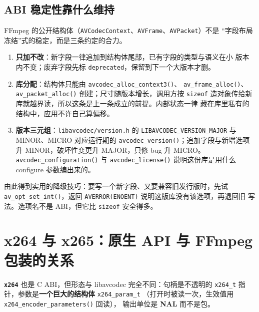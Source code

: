 \documentclass[12pt,a4paper,fontset=fandol]{ctexbook}
\newcommand{\Fn}[1]{\texttt{#1()}}
\newcommand{\Tp}[1]{\texttt{#1}}
\newcommand{\Bk}{\discretionary{}{}{}}
\newcommand{\Lib}[1]{\textbf{\texttt{#1}}}
\begin{document}
\subsection{ABI 稳定性靠什么维持}

FFmpeg 的公开结构体（\Tp{AVCodecContext}、\Tp{AVFrame}、\Tp{AVPacket}）不是
``字段布局冻结''式的稳定，而是三条约定的合力。

\begin{enumerate}
\item \textbf{只加不改}：新字段一律追加到结构体尾部，已有字段的类型与语义在小
  版本内不变；废弃字段先标 \Tp{deprecated}，保留到下一个大版本才删。
\item \textbf{库分配}：结构体只能由 \Fn{avcodec\_{\Bk}alloc\_{\Bk}context3}、
  \Fn{av\_{\Bk}frame\_{\Bk}alloc}、\Fn{av\_{\Bk}packet\_{\Bk}alloc} 创建；尺寸随版本增长，调用方按
  \texttt{sizeof} 造对象传给新库就越界读，所以这条是上一条成立的前提。内部状态一律
  藏在库里私有的结构中，应用不许自己算偏移。
\item \textbf{版本三元组}：\texttt{libavcodec/{\Bk}version.h} 的
  \Tp{LIBAVCODEC\_VERSION\_MAJOR} 与 MINOR、MICRO 对应运行期的
  \Fn{avcodec\_version}；追加字段与新增选项升 MINOR，破坏性变更升 MAJOR，只修 bug
  升 MICRO。\Fn{avcodec\_configuration} 与 \Fn{avcodec\_license} 说明这份库是用什么
  configure 参数编出来的。
\end{enumerate}

由此得到实用的降级技巧：要写一个新字段、又要兼容旧发行版时，先试
\Fn{av\_{\Bk}opt\_{\Bk}set\_{\Bk}int}，返回 \Tp{AVERROR(ENOENT)} 说明这版库没有该选项，再退回旧
写法。选项名不是 ABI，但它比 \texttt{sizeof} 安全得多。

\section{x264 与 x265：原生 API 与 FFmpeg 包装的关系}

\Lib{x264} 也是 C ABI，但形态与 libavcodec 完全不同：句柄是不透明的
\Tp{x264\_t} 指针，参数是\textbf{一个巨大的结构体} \Tp{x264\_{\Bk}param\_{\Bk}t}
（打开时被读一次，生效值用 \Fn{x264\_{\Bk}encoder\_{\Bk}parameters} 回读），
输出单位是 \textbf{NAL} 而不是包。
\end{document}
